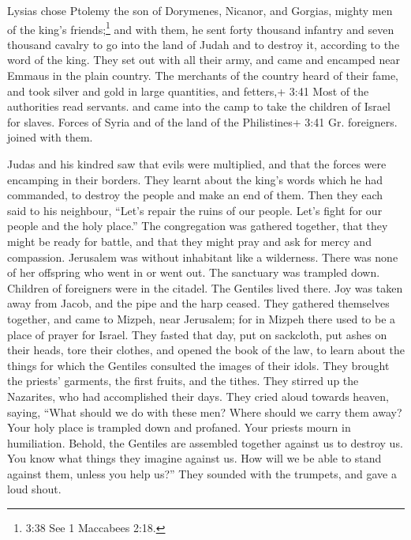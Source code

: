  Lysias chose Ptolemy the son of Dorymenes, Nicanor, and
Gorgias, mighty men of the king's friends;\footnote{3:38 See 1 Maccabees
  2:18.}  and with them, he sent forty thousand infantry
and seven thousand cavalry to go into the land of Judah and to destroy
it, according to the word of the king.  They set out with
all their army, and came and encamped near Emmaus in the plain country.
 The merchants of the country heard of their fame, and took
silver and gold in large quantities, and fetters,+ 3:41 Most of the
authorities read servants. and came into the camp to take the children
of Israel for slaves. Forces of Syria and of the land of the
Philistines+ 3:41 Gr. foreigners. joined with them.

 Judas and his kindred saw that evils were multiplied, and
that the forces were encamping in their borders. They learnt about the
king's words which he had commanded, to destroy the people and make an
end of them.  Then they each said to his neighbour, ``Let's
repair the ruins of our people. Let's fight for our people and the holy
place.''  The congregation was gathered together, that they
might be ready for battle, and that they might pray and ask for mercy
and compassion.  Jerusalem was without inhabitant like a
wilderness. There was none of her offspring who went in or went out. The
sanctuary was trampled down. Children of foreigners were in the citadel.
The Gentiles lived there. Joy was taken away from Jacob, and the pipe
and the harp ceased.  They gathered themselves together,
and came to Mizpeh, near Jerusalem; for in Mizpeh there used to be a
place of prayer for Israel.  They fasted that day, put on
sackcloth, put ashes on their heads, tore their clothes, 
and opened the book of the law, to learn about the things for which the
Gentiles consulted the images of their idols.  They brought
the priests' garments, the first fruits, and the tithes. They stirred up
the Nazarites, who had accomplished their days.  They cried
aloud towards heaven, saying, ``What should we do with these men? Where
should we carry them away?  Your holy place is trampled
down and profaned. Your priests mourn in humiliation. 
Behold, the Gentiles are assembled together against us to destroy us.
You know what things they imagine against us.  How will we
be able to stand against them, unless you help us?''  They
sounded with the trumpets, and gave a loud shout.

